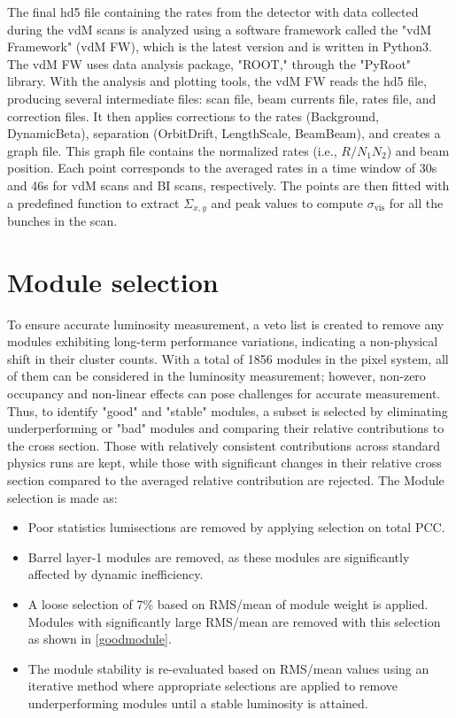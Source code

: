 The final hd5 file containing the rates from the detector with data collected during the vdM scans is analyzed using a software framework called the "vdM Framework" (vdM FW), which is the latest version and is written in Python3. The vdM FW uses data analysis package, "ROOT," through the "PyRoot" library. With the analysis and plotting tools, the vdM FW reads the hd5 file, producing several intermediate files: scan file, beam currents file, rates file, and correction files. It then applies corrections to the rates (Background, DynamicBeta), separation (OrbitDrift, LengthScale, BeamBeam), and creates a graph file. This graph file contains the normalized rates (i.e., $R/N_{1}N_{2}$) and beam position. Each point corresponds to the averaged rates in a time window of 30s and 46s for vdM scans and BI scans, respectively. The points are then fitted with a predefined function to extract $\Sigma_{x,y}$ and peak values to compute $\sigma_{\text{vis}}$ for all the bunches in the scan.

\section{Module selection}

To ensure accurate luminosity measurement, a veto list is created to remove any modules exhibiting long-term performance variations, indicating a non-physical shift in their cluster counts. With a total of 1856 modules in the pixel system, all of them can be considered in the luminosity measurement; however, non-zero occupancy and non-linear effects can pose challenges for accurate measurement. Thus, to identify "good" and "stable" modules, a subset is selected by eliminating  underperforming or "bad" modules and comparing their relative contributions to the cross section. Those with relatively consistent contributions across standard physics runs are kept, while those with significant changes in their relative cross section compared to the averaged relative contribution are rejected. The Module selection is made as:
\begin{itemize}
\item Poor statistics lumisections are removed by applying selection on total PCC.
\item Barrel layer-1 modules are removed, as these modules are significantly affected by dynamic inefficiency.
\item A loose selection of 7\% based on RMS/mean of module weight is applied. Modules with significantly large RMS/mean are removed with this selection as shown in \ref{goodmodule}.
\item The module stability is re-evaluated based on RMS/mean values using an iterative method where appropriate selections are applied to remove underperforming modules until a stable luminosity is attained.
\end{itemize}

